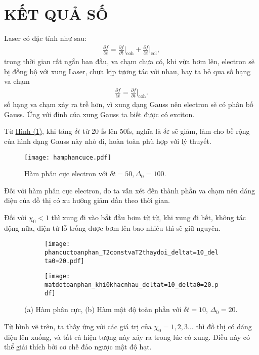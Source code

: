 \documentclass[%
reprint,
amsmath,amssymb,
superscriptaddress,
aps,
]{revtex4-2}
\newcommand{\at}[2]{\bigg\rvert_{#1}^{#2} }
\begin{document}
\section{\label{sec:level3} KẾT QUẢ SỐ}
Laser có đặc tính như sau:
\begin{equation}
	\begin{aligned}
		\frac{\partial f}{\partial t} = \frac{\partial f}{\partial t} \at{\text{coh}}{} +\frac{\partial f}{\partial t} \at{\text{col}}{},
	\end{aligned}
\end{equation}
trong thời gian rất ngắn ban đầu, va chạm chưa có, khi vừa bơm lên, electron sẽ bị đồng bộ với xung Laser, chưa kịp tương tác với nhau, hay ta bỏ qua số hạng va chạm 
\begin{equation}
	\begin{aligned}
		\frac{\partial f}{\partial t} = \frac{\partial f}{\partial t} \at{\text{coh}}{}.
	\end{aligned}
\end{equation}
số hạng va chạm xảy ra trễ hơn, vì xung dạng Gauss nên electron sẽ có phân bố Gauss. Ứng với đỉnh của xung Gauss ta biết được có exciton.

Từ \hyperref[fig:HamPhanBoElectronDeltat=50]{Hình (1)}, khi tăng $\delta t$ từ 20 fs lên 50fs, nghĩa là $\delta \varepsilon$ sẽ giảm, làm cho bề rộng của hình dạng Gauss này nhỏ đi, hoàn toàn phù hợp với lý thuyết.\\
\begin{figure}[H]
	\texttt{[image: hamphancuce.pdf]}
	\caption{\label{fig:Ham phan cuc} Hàm phân cực electron với $\delta t = 50, \Delta_{0} = 100$.}
\end{figure}
Đối với hàm phân cực electron, do ta vẫn xét đến thành phần va chạm nên dáng điệu của đồ thị có xu hướng giảm dần theo thời gian. 

Đối với $\chi_0 < 1$ thì xung đi vào bắt đầu bơm từ từ, khi xung đi hết, không tác động nữa, điện tử lỗ trống được bơm lên bao nhiêu thì sẽ giữ nguyên.
\begin{figure*}[htb]
	\centering
	\begin{subfigure}[b]{0.485\textwidth}
		\centering
		\texttt{[image: phancuctoanphan\_T2constvaT2thaydoi\_deltat=10\_delta0=20.pdf]}
		\caption{}
		\label{fig:phan cuc toan phan}
	\end{subfigure}
	\begin{subfigure}[b]{0.485\textwidth}
		\centering
		\texttt{[image: matdotoanphan\_khi0khacnhau\_deltat=10\_delta0=20.pdf]}
		\caption{}
		\label{fig:mat do toan phan}
	\end{subfigure}
	\caption{
		(a) Hàm phân cực, 
		(b) Hàm mật độ toàn phần với $\delta t = 10$, $\Delta_{0}=20$. 
	}
\end{figure*}
Từ hình vẽ trên, ta thấy ứng với các giá trị của $\chi_0 = 1,2,3\ldots$ thì đồ thị có dáng điệu lên xuống, và tất cả hiện tượng này xảy ra trong lúc có xung. Điều này có thể giải thích bởi cơ chế đảo ngược mật độ hạt.
\end{document}
